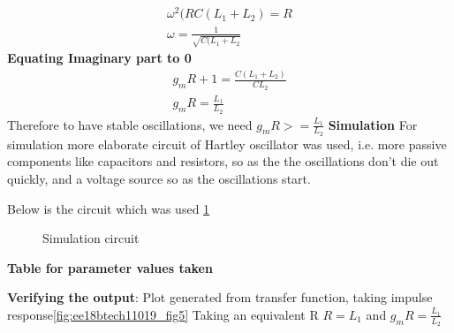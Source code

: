 \begin{enumerate}[label=\arabic*.,ref=\theenumi]
\begin{align}
    \omega^2(RC(L_1 +L_2) = R\\
    \omega = \frac{1}{\sqrt{C(L_1 + L_2}}
\end{align}
\textbf{Equating Imaginary part to 0}\newline
\begin{align}
    g_mR + 1 = \frac{C(L_1 +L_2)}{CL_2}\\
    g_mR = \frac{L_1}{L_2}
\end{align}
Therefore to have stable oscillations, we need \newline
$g_mR >= \frac{L_1}{L_2}$\newline\newline
\textbf{Simulation}\newline
For simulation more elaborate circuit of Hartley oscillator was used, i.e. more passive components like capacitors and resistors, so as the the oscillations don't die out quickly, and a voltage source so as the oscillations start.\newline

Below is the circuit which was used \ref{fig:ee18btech11019_fig4}
\begin{figure}[!ht]
	\begin{center}
		\resizebox{\columnwidth}{!}{}
	\end{center}
\caption{Simulation circuit}
\label{fig:ee18btech11019_fig4}
\end{figure}


\textbf{Table for parameter values taken}
\begin{table}[!ht]
\centering

\caption{}
\label{table:ee18btech11019_1}
\end{table}
\textbf{Verifying the output}:\newline
Plot generated from transfer function, taking impulse response\newline \ref{fig:ee18btech11019_fig5}
Taking an equivalent R  \newline
$R = L_1$ and $g_mR = \frac{L_1}{L_2}$\newline


\end{enumerate}
